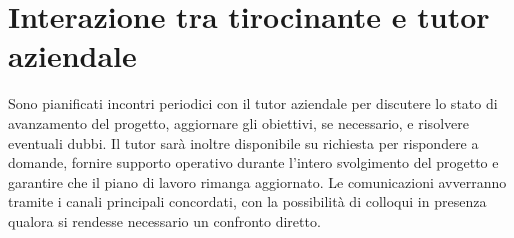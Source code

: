 \section{Interazione tra tirocinante e tutor aziendale}
Sono pianificati incontri periodici con il tutor aziendale per discutere lo stato di avanzamento del progetto, aggiornare gli obiettivi, se necessario, e risolvere eventuali dubbi. Il tutor sarà inoltre disponibile su richiesta per rispondere a domande, fornire supporto operativo durante l'intero svolgimento del progetto e garantire che il piano di lavoro rimanga aggiornato. Le comunicazioni avverranno tramite i canali principali concordati, con la possibilità di colloqui in presenza qualora si rendesse necessario un confronto diretto.